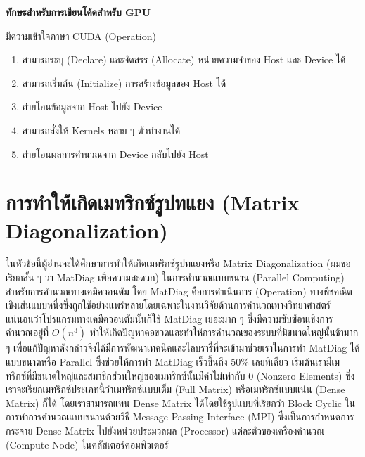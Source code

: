 \noindent \textbf{ทักษะสำหรับการเขียนโค้ดสำหรับ GPU}

\noindent มีความเข้าใจภาษา CUDA (Operation)
%
\begin{enumerate}[topsep=0pt,noitemsep]
  \setlength\itemsep{0.5em}
  \item สามารถระบุ (Declare) และจัดสรร (Allocate) หน่วยความจำของ Host และ Device ได้

  \item สามารถเริ่มต้น (Initialize) การสร้างข้อมูลของ Host ได้

  \item ถ่ายโอนข้อมูลจาก Host ไปยัง Device

  \item สามารถสั่งให้ Kernels หลาย ๆ ตัวทำงานได้

  \item ถ่ายโอนผลการคำนวณจาก Device กลับไปยัง Host
\end{enumerate}

\section{การทำให้เกิดเมทริกซ์รูปทแยง (Matrix Diagonalization)}

ในหัวข้อนี้ผู้อ่านจะได้ศึกษาการทำให้เกิดเมทริกซ์รูปทแยงหรือ Matrix Diagonalization (ผมขอเรียกสั้น ๆ ว่า MatDiag เพื่อความสะดวก)
ในการคำนวณแบบขนาน (Parallel Computing) สำหรับการคำนวณทางเคมีควอนตัม โดย MatDiag คือการดำเนินการ (Operation)
ทางพีชคณิตเชิงเส้นแบบหนึ่งซึ่งถูกใช้อย่างแพร่หลายโดยเฉพาะในงานวิจัยด้านการคำนวณทางวิทยาศาสตร์ แน่นอนว่าโปรแกรมทางเคมีควอนตัมนั้นก็ใช้
MatDiag เยอะมาก ๆ ซึ่งมีความซับซ้อนเชิงการคำนวณอยู่ที่ $O(n^3)$ ทำให้เกิดปัญหาคอขวดและทำให้การคำนวณของระบบที่มีขนาดใหญ่นั้นช้ามาก ๆ
เพื่อแก้ปัญหาดังกล่าวจึงได้มีการพัฒนาเทคนิคและไลบรารี่ที่จะเข้ามาช่วยเราในการทำ MatDiag ได้แบบขนาดหรือ Parallel ซึ่งช่วยให้การทำ
MatDiag เร็วขึ้นถึง 50\% เลยทีเดียว เริ่มต้นเรามีเมทริกซ์ที่มีขนาดใหญ่และสมาชิกส่วนใหญ่ของเมทริกซ์นั้นมีค่าไม่เท่ากับ 0 (Nonzero Elements)
ซึ่งเราจะเรียกเมทริกซ์ประเภทนี้ว่าเมทริกซ์แบบเต็ม (Full Matrix) หรือเมทริกซ์แบบแน่น (Dense Matrix) ก็ได้ โดยเราสามารถแทน Dense
Matrix ได้โดยใช้รูปแบบที่เรียกว่า Block Cyclic ในการทำการคำนวณแบบขนานด้วยวิธี Message-Passing Interface (MPI)
ซึ่งเป็นการกำหนดการกระจาย Dense Matrix ไปยังหน่วยประมวลผล (Processor) แต่ละตัวของเครื่องคำนวณ (Compute Node)
ในคลัสเตอร์คอมพิวเตอร์

